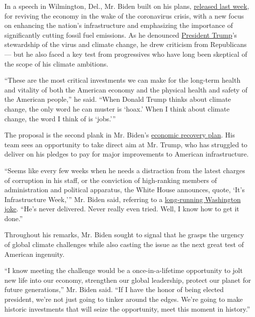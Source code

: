 In a speech in Wilmington, Del., Mr. Biden built on his plans,
\href{https://www.nytimes3xbfgragh.onion/2020/07/09/us/politics/biden-buy-american.html}{released
last week}, for reviving the economy in the wake of the coronavirus
crisis, with a new focus on enhancing the nation's infrastructure and
emphasizing the importance of significantly cutting fossil fuel
emissions. As he denounced
\href{https://www.nytimes3xbfgragh.onion/interactive/2020/us/elections/donald-trump.html}{President
Trump}'s stewardship of the virus and climate change, he drew criticism
from Republicans --- but he also faced a key test from progressives who
have long been skeptical of the scope of his climate ambitions.

``These are the most critical investments we can make for the long-term
health and vitality of both the American economy and the physical health
and safety of the American people,'' he said. ``When Donald Trump thinks
about climate change, the only word he can muster is `hoax.' When I
think about climate change, the word I think of is `jobs.'''

The proposal is the second plank in Mr. Biden's
\href{https://www.nytimes3xbfgragh.onion/2020/07/09/us/politics/biden-buy-american.html}{economic
recovery plan}. His team sees an opportunity to take direct aim at Mr.
Trump, who has struggled to deliver on his pledges to pay for major
improvements to American infrastructure.

``Seems like every few weeks when he needs a distraction from the latest
charges of corruption in his staff, or the conviction of high-ranking
members of administration and political apparatus, the White House
announces, quote, `It's Infrastructure Week,''' Mr. Biden said,
referring to a
\href{https://www.nytimes3xbfgragh.onion/2019/05/22/us/politics/trump-infrastructure-week.html}{long-running
Washington joke}. ``He's never delivered. Never really even tried. Well,
I know how to get it done.''

Throughout his remarks, Mr. Biden sought to signal that he grasps the
urgency of global climate challenges while also casting the issue as the
next great test of American ingenuity.

``I know meeting the challenge would be a once-in-a-lifetime opportunity
to jolt new life into our economy, strengthen our global leadership,
protect our planet for future generations,'' Mr. Biden said. ``If I have
the honor of being elected president, we're not just going to tinker
around the edges. We're going to make historic investments that will
seize the opportunity, meet this moment in history.''

